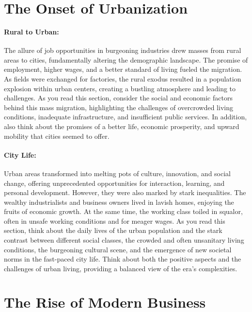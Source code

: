 \documentclass[a4paper,12pt]{book}
\begin{document}
\section*{The Onset of Urbanization}

\paragraph{Rural to Urban:}
The allure of job opportunities in burgeoning industries drew masses from rural areas to cities, fundamentally altering the demographic landscape. The promise of employment, higher wages, and a better standard of living fueled the migration. As fields were exchanged for factories, the rural exodus resulted in a population explosion within urban centers, creating a bustling atmosphere and leading to challenges. As you read this section, consider the social and economic factors behind this mass migration, highlighting the challenges of overcrowded living conditions, inadequate infrastructure, and insufficient public services. In addition, also think about the promises of a better life, economic prosperity, and upward mobility that cities seemed to offer.

\paragraph{City Life:}
Urban areas transformed into melting pots of culture, innovation, and social change, offering unprecedented opportunities for interaction, learning, and personal development. However, they were also marked by stark inequalities. The wealthy industrialists and business owners lived in lavish homes, enjoying the fruits of economic growth. At the same time, the working class toiled in squalor, often in unsafe working conditions and for meager wages. As you read this section, think about the daily lives of the urban population and the stark contrast between different social classes, the crowded and often unsanitary living conditions, the burgeoning cultural scene, and the emergence of new societal norms in the fast-paced city life. Think about both the positive aspects and the challenges of urban living, providing a balanced view of the era’s complexities.

\section*{The Rise of Modern Business}
\end{document}
